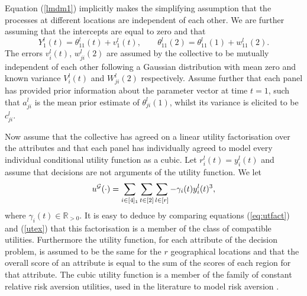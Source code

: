 Equation (\ref{lmdm1}) implicitly makes the simplifying assumption that the processes at different locations are independent of each other. We are further assuming that the intercepts are equal to zero and that 
\begin{equation}
Y_1^l(t)=\theta_{11}^l(t)+v_{1}^l(t),\;\;\;\;\;\;\; \theta_{11}^l(2)=\theta_{11}^l(1)+w_{11}^l(2).
\label{lmdm2}
\end{equation}
  The errors $v_i^l(t)$, $w^l_{ji}(2)$ are assumed by the collective to be mutually independent of each other  following a Gaussian distribution with mean zero and known variance $V_i^l(t)$ and $W^l_{ji}(2)$ respectively. Assume further that each panel has provided prior information about the parameter vector at time $t=1$, such that $a^l_{ji}$ is the mean prior estimate of $\theta^l_{ji}(1)$, whilst its variance is elicited to be $c^l_{ji}$. 

Now assume that the collective has agreed on a linear utility factorisation over the attributes and that each panel has individually agreed to model every individual conditional utility function as a cubic. Let $r_i^l(t)=y_i^l(t)$ and assume that decisions are not arguments of the utility function. We let
\begin{equation}
\label{utex}
u^{\Gr}(\cdot)=\sum_{i\in[4]_1}\sum_{t\in[2]}\sum_{l\in[r]} -\gamma_i(t)y_i^l(t)^3,
\end{equation}
where $\gamma_i(t)\in\mathbb{R}_{>0}$. It is easy to deduce by comparing equations (\ref{eq:utfact}) and (\ref{utex}) that this factorisation is a member of the class of compatible utilities.  Furthermore the utility function, for each attribute of the decision problem, is assumed to be the same for the $r$ geographical locations and that the overall score of an attribute is equal to the sum of the scores of each region for that attribute.
The cubic utility function is a member of the family of constant relative risk aversion utilities, used in the literature to model risk aversion \citep[see][]{wakker2008}. 

